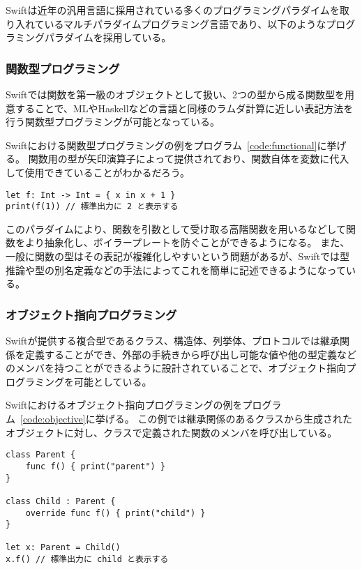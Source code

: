 Swiftは近年の汎用言語に採用されている多くのプログラミングパラダイムを取り入れているマルチパラダイムプログラミング言語であり、以下のようなプログラミングパラダイムを採用している。

\subsubsection{関数型プログラミング}

Swiftでは関数を第一級のオブジェクトとして扱い、2つの型から成る関数型を用意することで、MLやHaskellなどの言語と同様のラムダ計算に近しい表記方法を行う関数型プログラミングが可能となっている。

Swiftにおける関数型プログラミングの例をプログラム~\ref{code:functional}に挙げる。
関数用の型が矢印演算子によって提供されており、関数自体を変数に代入して使用できていることがわかるだろう。

\begin{lstlisting}[caption=Swiftにおける関数型プログラミングの例, label=code:functional]
let f: Int -> Int = { x in x + 1 }
print(f(1)) // 標準出力に 2 と表示する
\end{lstlisting}

このパラダイムにより、関数を引数として受け取る高階関数を用いるなどして関数をより抽象化し、ボイラープレートを防ぐことができるようになる。
また、一般に関数の型はその表記が複雑化しやすいという問題があるが、Swiftでは型推論や型の別名定義などの手法によってこれを簡単に記述できるようになっている。

\subsubsection{オブジェクト指向プログラミング}

Swiftが提供する複合型であるクラス、構造体、列挙体、プロトコルでは継承関係を定義することができ、外部の手続きから呼び出し可能な値や他の型定義などのメンバを持つことができるように設計されていることで、オブジェクト指向プログラミングを可能としている。

Swiftにおけるオブジェクト指向プログラミングの例をプログラム~\ref{code:objective}に挙げる。
この例では継承関係のあるクラスから生成されたオブジェクトに対し、クラスで定義された関数のメンバを呼び出している。

\begin{lstlisting}[caption=Swiftにおけるオブジェクト指向プログラミングの例, label=code:objective]
class Parent {
    func f() { print("parent") }
}

class Child : Parent {
    override func f() { print("child") }
}

let x: Parent = Child()
x.f() // 標準出力に child と表示する
\end{lstlisting}

